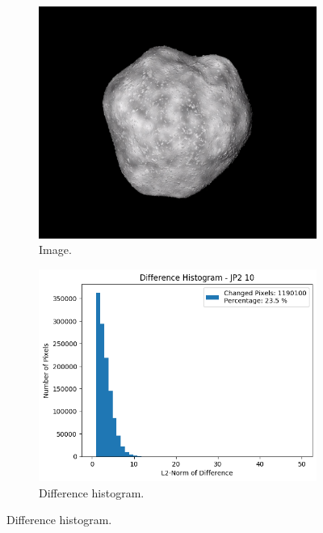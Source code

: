 \begin{figure}[htb]
    \centering
    \begin{subfigure}[b]{0.48\textwidth}
        \centering
        \includegraphics[width=\textwidth]{doc/thesis/0_figures/compare_quality/set1/jp2_10.png}
        \caption{Image.}
        \label{fig:img_quality_comp_jp2_10_orig}
    \end{subfigure}
    \begin{subfigure}[b]{0.48\textwidth}
        \centering
        \includegraphics[width=\textwidth]{doc/thesis/0_figures/compare_quality/set1/jp2_10_diff_histogram.png}
        \caption{Difference histogram.}

\end{subfigure}
\end{figure}

